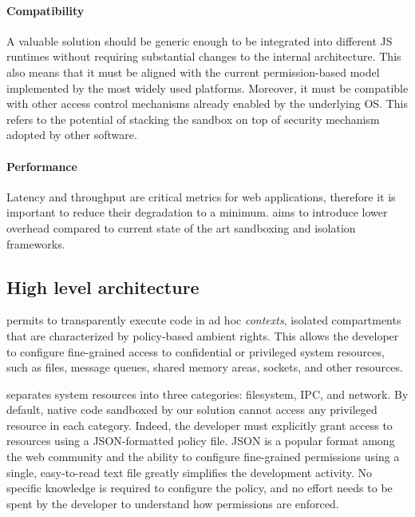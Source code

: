 \paragraph{Compatibility}
A valuable solution should be generic enough to be integrated into
different JS runtimes without requiring substantial changes to the
internal architecture. This also means that it must be aligned with
the current permission-based model implemented by the most widely used
platforms. Moreover, it must be compatible with other access control
mechanisms already enabled by the underlying OS. This refers to the
potential of stacking the sandbox on top of security mechanism adopted
by other software.

\paragraph{Performance}
Latency and throughput are critical metrics for web applications,
therefore it is important to reduce their degradation to a
minimum. \pap aims to introduce lower overhead compared to current
state of the art sandboxing and isolation frameworks.


\subsection{High level architecture}
\label{sect:sandbox-overview}

\pap permits to transparently execute code in ad hoc {\em contexts},
isolated compartments that are characterized by policy-based ambient
rights. This allows the developer to configure fine-grained access to
confidential or privileged system resources, such as files, message
queues, shared memory areas, sockets, and other resources.

\pap separates system resources into three categories: filesystem,
IPC, and network. By default, native code sandboxed by our solution
cannot access any privileged resource in each category. Indeed, the
developer must explicitly grant access to resources using a
JSON-formatted policy file. JSON is a popular format among the web
community and the ability to configure fine-grained permissions using
a single, easy-to-read text file greatly simplifies the development
activity. No specific knowledge is required to configure the policy,
and no effort needs to be spent by the developer to understand how
permissions are enforced.

